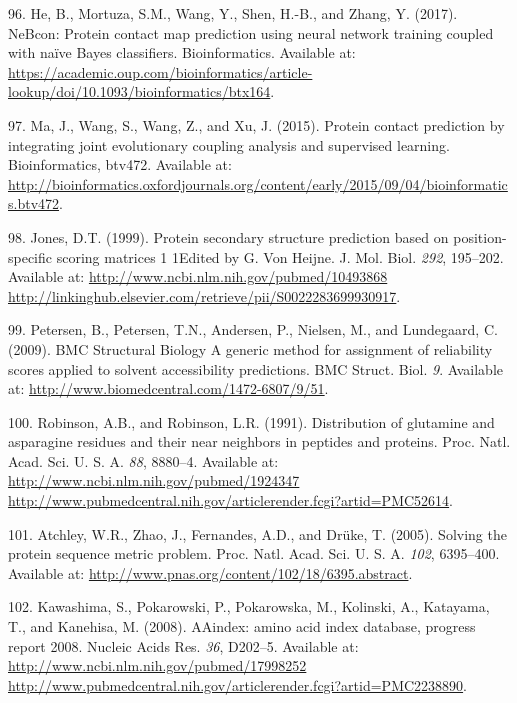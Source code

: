 \documentclass[12pt,a4paper,twoside]{book}
\theoremstyle{definition}
\theoremstyle{definition}
\theoremstyle{remark}
\begin{document}
\hypertarget{ref-He2017}{}
96. He, B., Mortuza, S.M., Wang, Y., Shen, H.-B., and Zhang, Y. (2017).
NeBcon: Protein contact map prediction using neural network training
coupled with naïve Bayes classifiers. Bioinformatics. Available at:
\url{https://academic.oup.com/bioinformatics/article-lookup/doi/10.1093/bioinformatics/btx164}.

\hypertarget{ref-Ma2015a}{}
97. Ma, J., Wang, S., Wang, Z., and Xu, J. (2015). Protein contact
prediction by integrating joint evolutionary coupling analysis and
supervised learning. Bioinformatics, btv472. Available at:
\url{http://bioinformatics.oxfordjournals.org/content/early/2015/09/04/bioinformatics.btv472}.

\hypertarget{ref-Jones1999}{}
98. Jones, D.T. (1999). Protein secondary structure prediction based on
position-specific scoring matrices 1 1Edited by G. Von Heijne. J. Mol.
Biol. \emph{292}, 195--202. Available at:
\href{http://www.ncbi.nlm.nih.gov/pubmed/10493868\%20http://linkinghub.elsevier.com/retrieve/pii/S0022283699930917}{http://www.ncbi.nlm.nih.gov/pubmed/10493868 http://linkinghub.elsevier.com/retrieve/pii/S0022283699930917}.

\hypertarget{ref-Petersen2009a}{}
99. Petersen, B., Petersen, T.N., Andersen, P., Nielsen, M., and
Lundegaard, C. (2009). BMC Structural Biology A generic method for
assignment of reliability scores applied to solvent accessibility
predictions. BMC Struct. Biol. \emph{9}. Available at:
\url{http://www.biomedcentral.com/1472-6807/9/51}.

\hypertarget{ref-Robinson1991}{}
100. Robinson, A.B., and Robinson, L.R. (1991). Distribution of
glutamine and asparagine residues and their near neighbors in peptides
and proteins. Proc. Natl. Acad. Sci. U. S. A. \emph{88}, 8880--4.
Available at:
\href{http://www.ncbi.nlm.nih.gov/pubmed/1924347\%20http://www.pubmedcentral.nih.gov/articlerender.fcgi?artid=PMC52614}{http://www.ncbi.nlm.nih.gov/pubmed/1924347 http://www.pubmedcentral.nih.gov/articlerender.fcgi?artid=PMC52614}.

\hypertarget{ref-Atchley2005}{}
101. Atchley, W.R., Zhao, J., Fernandes, A.D., and Drüke, T. (2005).
Solving the protein sequence metric problem. Proc. Natl. Acad. Sci. U.
S. A. \emph{102}, 6395--400. Available at:
\url{http://www.pnas.org/content/102/18/6395.abstract}.

\hypertarget{ref-Kawashima2008}{}
102. Kawashima, S., Pokarowski, P., Pokarowska, M., Kolinski, A.,
Katayama, T., and Kanehisa, M. (2008). AAindex: amino acid index
database, progress report 2008. Nucleic Acids Res. \emph{36}, D202--5.
Available at:
\href{http://www.ncbi.nlm.nih.gov/pubmed/17998252\%20http://www.pubmedcentral.nih.gov/articlerender.fcgi?artid=PMC2238890}{http://www.ncbi.nlm.nih.gov/pubmed/17998252 http://www.pubmedcentral.nih.gov/articlerender.fcgi?artid=PMC2238890}.
\end{document}
